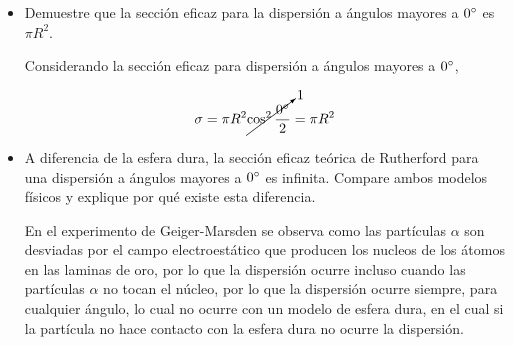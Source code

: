 \documentclass[12pt,a4paper]{article}
\begin{document}
\begin{itemize}
\item Demuestre que la sección eficaz para la dispersión a ángulos mayores a $0 \degree$ es $\pi R^2$.

Considerando la sección eficaz para dispersión a ángulos mayores a $0\degree$, 

$$\sigma =  \pi R^2\cancelto{1}{\cos^2\frac{0\degree}{2}} = \pi R^2$$

\item A diferencia de la esfera dura, la sección eficaz teórica de Rutherford para una dispersión a ángulos mayores a $0\degree$ es infinita. Compare ambos modelos físicos y explique por qué existe esta diferencia.

En el experimento de Geiger-Marsden se observa como las partículas $\alpha$ son desviadas por el campo electroestático que producen los nucleos de los átomos en las laminas de oro, por lo que la dispersión ocurre incluso cuando las partículas $\alpha$ no tocan el núcleo, por lo que la dispersión ocurre siempre, para cualquier ángulo, lo cual no ocurre con un modelo de esfera dura, en el cual si la partícula no hace contacto con la esfera dura no ocurre la dispersión.

\end{itemize}
\end{document}

